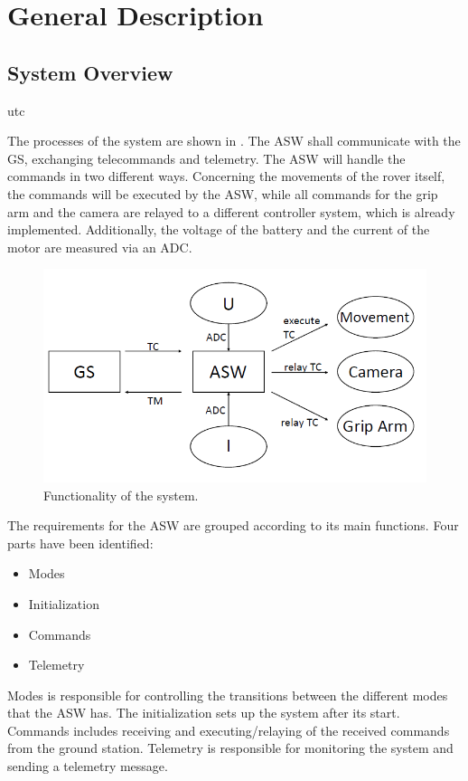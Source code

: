
\chapter{General Description}


\section{System Overview}

\gls{utc}

The processes of the system are shown in . The ASW shall communicate with the GS, exchanging telecommands and telemetry. The ASW will handle the commands in two different ways. Concerning the movements of the rover itself, the commands will be executed by the ASW, while all commands for the grip arm and the camera are relayed to a different controller system, which is already implemented. Additionally, the voltage of the battery and the current of the motor are measured via an ADC.\\

\begin{figure}[H]
\centering
\includegraphics[scale=0.7]{system.PNG}
\caption{Functionality of the system.}
\label{fig:system}
\end{figure}


The requirements for the ASW are grouped according to its main functions. Four parts have been identified:
\begin{itemize}
\item Modes
\item Initialization
\item Commands
\item Telemetry
\end{itemize}

Modes is responsible for controlling the transitions between the different modes that the ASW has. The initialization sets up the system after its start. Commands includes receiving and executing/relaying of the received commands from the ground station. Telemetry is responsible for monitoring the system and sending a telemetry message.


